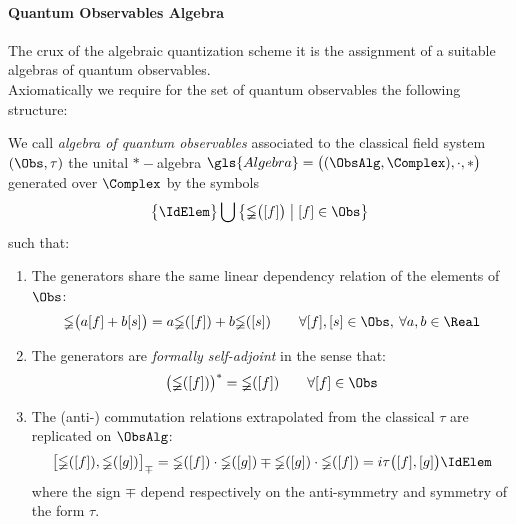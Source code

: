 \documentclass[Main]{subfiles}
\begin{document}
		\paragraph{Quantum Observables Algebra}
		The crux of the algebraic quantization scheme it is the assignment of a suitable algebras of quantum observables.\\
		Axiomatically we require for the set of quantum observables the following structure:

		\begin{definition}\label{Def:QuantumObsAlgebra}
			We call \emph{algebra of quantum observables} associated to the classical field system $(\Obs, \tau)$ the unital $\ast-$algebra $\gls{Algebra}= \big( (\ObsAlg, \Complex),\cdot,*\big)$ generated over $\Complex$ by the symbols
			\begin{displaymath}
				\big\{\IdElem\big\}\bigcup \big\{\mathbb{\Phi}\big( [f]\big) \; \big\vert \;  [f] \in \Obs \big\}
			\end{displaymath}
			such that:
			\begin{enumerate}
				\item The generators
				share the same linear dependency relation of the elements of $\Obs$:
					\begin{equation}\label{Ip:GenIndip}
						\mathbb{\Phi} \big(a [f] + b [s] \big) =
						a \mathbb{\Phi} ([f]) + b \mathbb{\Phi} ([s]) \qquad \forall [f],[s] \in \Obs,\: \forall a,b \in \Real
					\end{equation}
				\item The generators are \emph{formally self-adjoint} in the sense that:
					\begin{equation}\label{Ip:GenSelfAd}
						\big( \mathbb{\Phi}([f]) \big)^* = \mathbb{\Phi}([f]) \qquad \forall [f] \in \Obs
					\end{equation}
				\item The (anti-) commutation relations extrapolated from %
					the classical $\tau$ are replicated on $\ObsAlg$:
					\begin{equation}\label{Ip:ImplementCCR}
						\big[ \mathbb{\Phi}([f]), \mathbb{\Phi}([g]) \big]_\mp = \mathbb{\Phi}([f]) \cdot \mathbb{\Phi}([g]) \mp \mathbb{\Phi}([g]) \cdot \mathbb{\Phi}([f]) = i \tau\big( [f], [g] \big) \IdElem
					\end{equation}
					where the sign $\mp$ depend respectively on the anti-symmetry and symmetry of the form $\tau$.
			\end{enumerate}

		\end{definition}
		\vspace{3mm}
\end{document}
